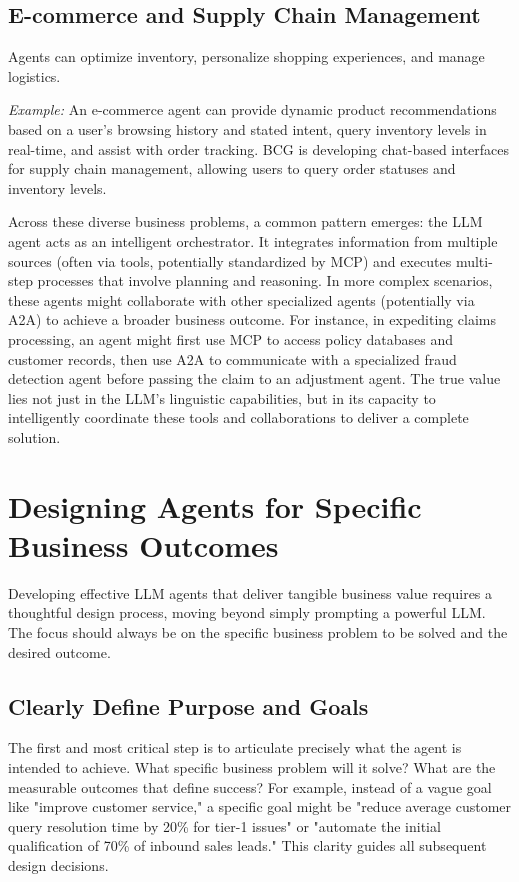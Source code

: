 \subsection{E-commerce and Supply Chain Management}
Agents can optimize inventory, personalize shopping experiences, and manage logistics.

\textit{Example:} An e-commerce agent can provide dynamic product recommendations based on a user's browsing history and stated intent, query inventory levels in real-time, and assist with order tracking. BCG is developing chat-based interfaces for supply chain management, allowing users to query order statuses and inventory levels.

Across these diverse business problems, a common pattern emerges: the LLM agent acts as an intelligent orchestrator. It integrates information from multiple sources (often via tools, potentially standardized by MCP) and executes multi-step processes that involve planning and reasoning. In more complex scenarios, these agents might collaborate with other specialized agents (potentially via A2A) to achieve a broader business outcome. For instance, in expediting claims processing, an agent might first use MCP to access policy databases and customer records, then use A2A to communicate with a specialized fraud detection agent before passing the claim to an adjustment agent. The true value lies not just in the LLM's linguistic capabilities, but in its capacity to intelligently coordinate these tools and collaborations to deliver a complete solution.

\section{Designing Agents for Specific Business Outcomes}
Developing effective LLM agents that deliver tangible business value requires a thoughtful design process, moving beyond simply prompting a powerful LLM. The focus should always be on the specific business problem to be solved and the desired outcome.

\subsection{Clearly Define Purpose and Goals}
The first and most critical step is to articulate precisely what the agent is intended to achieve. What specific business problem will it solve? What are the measurable outcomes that define success? For example, instead of a vague goal like "improve customer service," a specific goal might be "reduce average customer query resolution time by 20\% for tier-1 issues" or "automate the initial qualification of 70\% of inbound sales leads." This clarity guides all subsequent design decisions.

